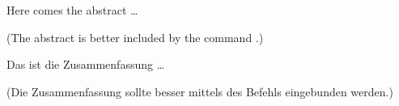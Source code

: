 \thispagestyle{empty}
\begin{center} \huge \bfseries \abstractname \end{center}
Here comes the abstract \ldots

(The abstract is better included by the command \verb||.)
\clearpage

\thispagestyle{empty}
\begin{otherlanguage}{ngerman}
  \begin{center} \huge \bfseries \abstractname \end{center}
  Das ist die Zusammenfassung \ldots
  
  (Die Zusammenfassung sollte besser mittels des Befehls \verb||
  eingebunden werden.)
\end{otherlanguage}
\cleardoublepage